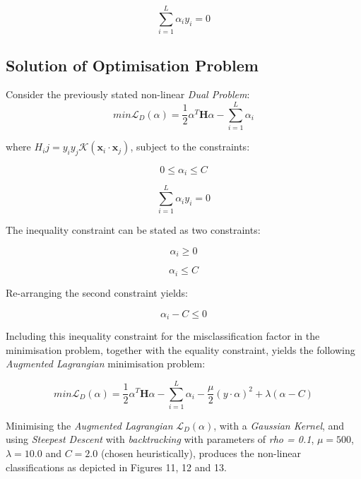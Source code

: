 \documentclass[10pt, a4paper,reqno]{amsart}
\begin{document}
\begin{equation}
\sum_{i=1}^{L}\alpha_i y_i = 0
\end{equation}


\subsection{Solution of Optimisation Problem}

Consider the previously stated non-linear \emph{Dual Problem}:
\begin{equation}
min\mathcal{L}_D(\alpha) = \frac{1}{2}\alpha^T\mathbf{H}\alpha - \sum_{i=1}^{L}\alpha_i
\end{equation}

where $H_ij = y_i y_j \mathcal{K}(\mathbf{x}_i\cdot\mathbf{x}_j)$, subject to the constraints:

\begin{equation}
0\leq\alpha_i\leq C
\end{equation}

\begin{equation}
\sum_{i=1}^{L}\alpha_i y_i = 0
\end{equation}

The inequality constraint can be stated as two constraints:

\begin{equation}
\alpha_i\geq 0
\end{equation}

\begin{equation}
\alpha_i\leq C
\end{equation}

Re-arranging the second constraint yields:

\begin{equation}
\alpha_i - C \leq 0
\end{equation}

Including this inequality constraint for the misclassification factor in the minimisation problem, together with the equality constraint, yields the following \emph{Augmented Lagrangian} minimisation problem:

\begin{equation}
min\mathcal{L}_D(\alpha) = \frac{1}{2}\alpha^T\mathbf{H}\alpha - \sum_{i=1}^{L}\alpha_i - \frac{\mu}{2}(y\cdot\alpha)^2 + \lambda(\alpha -C)
\end{equation}

Minimising the \emph{Augmented Lagrangian} $\mathcal{L}_D(\alpha)$, with a \emph{Gaussian Kernel}, and using \emph{Steepest Descent} with \emph{backtracking} with parameters of \emph{rho = 0.1}, $\mu = 500$, $\lambda=10.0$ and $C=2.0$ (chosen heuristically), produces the non-linear classifications as depicted in Figures 11, 12 and 13.
\end{document}
